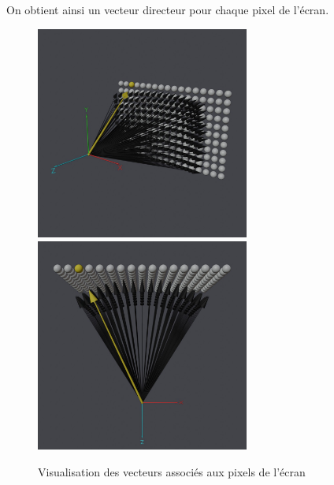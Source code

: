 On obtient ainsi un vecteur directeur pour chaque pixel de l'écran.
\begin{figure}[h]
    \centering
    \includegraphics[width=7cm]{images/vectorscreen1.jpg}
    \includegraphics[width=7cm]{images/vectorscreen2.jpg}
    \caption{Visualisation des vecteurs associés aux pixels de l'écran }
    \label{fig:screenvectors}
\end{figure}